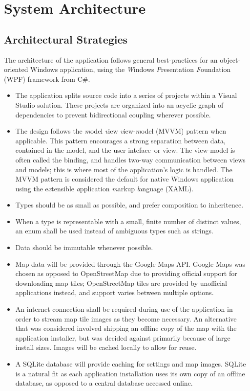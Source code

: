 \documentclass[12pt, letterpaper]{article}
\begin{document}
\newpage
\section{System Architecture}
\subsection{Architectural Strategies}
The architecture of the application follows general best-practices for an object-oriented Windows application,
  using the \emph{W}indows \emph{P}resentation \emph{F}oundation (WPF) framework from C\#.
\begin{itemize}
  \item The application splits source code into a series of projects within a Visual Studio solution.
    These projects are organized into an acyclic graph of dependencies to prevent bidirectional coupling wherever possible.
  \item The design follows the \emph{m}odel \emph{v}iew \emph{v}iew-\emph{m}odel (MVVM) pattern when applicable.
    This pattern encourages a strong separation between data, contained in the model, and the user inteface--or view.
    The view-model is often called the binding, and handles two-way communication between views and models;
    this is where most of the application's logic is handled.
    The MVVM pattern is considered the default for native Windows application using the e\emph{x}tensible \emph{a}pplication \emph{m}arkup \emph{l}anguage (XAML)\cite{msdn_mvvm}.
  \item Types should be as small as possible, and prefer composition to inheritence.
  \item When a type is representable with a small, finite number of distinct values, an enum shall be used instead of ambiguous types such as strings.
  \item Data should be immutable whenever possible.
  \item Map data will be provided through the Google Maps API.
    Google Maps was chosen as opposed to OpenStreetMap due to providing official support for downloading map tiles\cite{gmaps_tiles};
    OpenStreetMap tiles are provided by unofficial applications instead, and support varies between multiple options\cite{osm_tiles}.
  \item An internet connection shall be required during use of the application in order to stream map tile images as they become necessary.
    An alternative that was considered involved shipping an offline copy of the map with the application installer,
    but was decided against primarily because of large install sizes.
    Images will be cached locally to allow for reuse.
  \item A SQLite database will provide caching for settings and map images.
    SQLite is a natural fit as each application installation uses its own copy of an offline database, as opposed to a central database accessed online.
\end{itemize}
\end{document}
